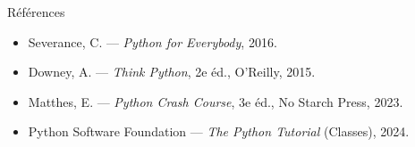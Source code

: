 \documentclass[aspectratio=169,11pt]{beamer}
\begin{document}
\begin{frame}{Références}
\begin{itemize}\small
  \item Severance, C. — \emph{Python for Everybody}, 2016.
  \item Downey, A. — \emph{Think Python}, 2e éd., O'Reilly, 2015.
  \item Matthes, E. — \emph{Python Crash Course}, 3e éd., No Starch Press, 2023.
  \item Python Software Foundation — \emph{The Python Tutorial} (Classes), 2024.
\end{itemize}
\end{frame}
\end{document}
